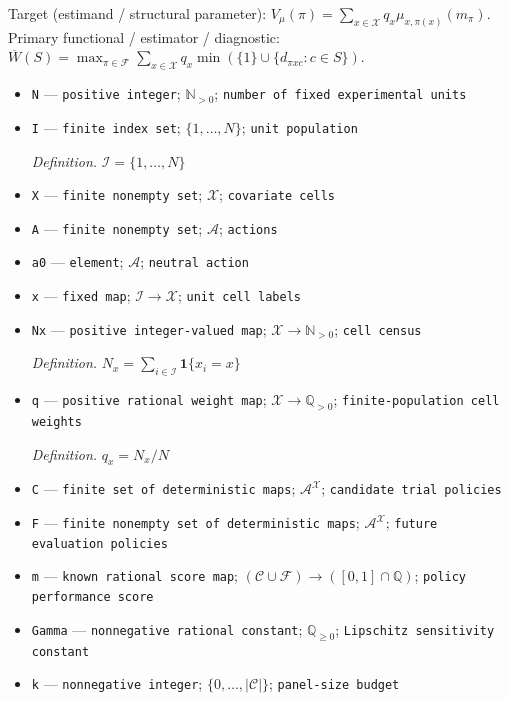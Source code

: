 \documentclass{article}
\begin{document}
Target (estimand / structural parameter): \(V_{\mu}(\pi)=\sum_{x\in\mathcal X}q_x\mu_{x,\pi(x)}(m_{\pi})\).
Primary functional / estimator / diagnostic: \(\overline W(S)=\max_{\pi\in\mathcal F}\sum_{x\in\mathcal X}q_x\min(\{1\}\cup\{d_{\pi xc}:c\in S\})\).
\begin{itemize}
  \item \texttt{N} --- \texttt{positive integer}; \(\mathbb N_{>0}\); \texttt{number of fixed experimental units}
  \item \texttt{I} --- \texttt{finite index set}; \(\{1,\ldots,N\}\); \texttt{unit population}
  \par\smallskip\noindent\emph{Definition.} \(\mathcal I=\{1,\ldots,N\}\)
  \item \texttt{X} --- \texttt{finite nonempty set}; \(\mathcal X\); \texttt{covariate cells}
  \item \texttt{A} --- \texttt{finite nonempty set}; \(\mathcal A\); \texttt{actions}
  \item \texttt{a0} --- \texttt{element}; \(\mathcal A\); \texttt{neutral action}
  \item \texttt{x} --- \texttt{fixed map}; \(\mathcal I\to\mathcal X\); \texttt{unit cell labels}
  \item \texttt{Nx} --- \texttt{positive integer-\allowbreak{}valued map}; \(\mathcal X\to\mathbb N_{>0}\); \texttt{cell census}
  \par\smallskip\noindent\emph{Definition.} \(N_x=\sum_{i\in\mathcal I}\mathbf 1\{x_i=x\}\)
  \item \texttt{q} --- \texttt{positive rational weight map}; \(\mathcal X\to\mathbb Q_{>0}\); \texttt{finite-\allowbreak{}population cell weights}
  \par\smallskip\noindent\emph{Definition.} \(q_x=N_x/N\)
  \item \texttt{C} --- \texttt{finite set of deterministic maps}; \(\mathcal A^{\mathcal X}\); \texttt{candidate trial policies}
  \item \texttt{F} --- \texttt{finite nonempty set of deterministic maps}; \(\mathcal A^{\mathcal X}\); \texttt{future evaluation policies}
  \item \texttt{m} --- \texttt{known rational score map}; \((\mathcal C\cup\mathcal F)\to([0,1]\cap\mathbb Q)\); \texttt{policy performance score}
  \item \texttt{Gamma} --- \texttt{nonnegative rational constant}; \(\mathbb Q_{\geq 0}\); \texttt{Lipschitz sensitivity constant}
  \item \texttt{k} --- \texttt{nonnegative integer}; \(\{0,\ldots,|\mathcal C|\}\); \texttt{panel-\allowbreak{}size budget}

\end{itemize}
\end{document}
